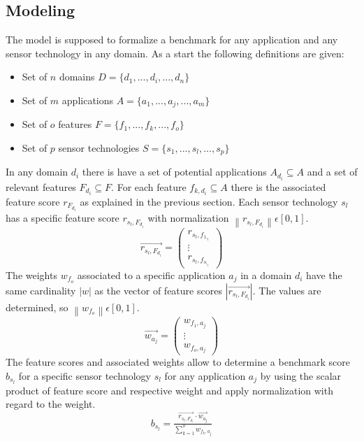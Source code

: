 \subsection{Modeling}
The model is supposed to formalize a benchmark for any application and any sensor technology in any domain. As a start the following definitions are given:
\begin{itemize}
\item Set of $n$ domains \(D=\{d_1,...,d_i,...,d_n\}\)
\item Set of $m$ applications \(A=\{a_1,...,a_j,...,a_m\}\)
\item Set of $o$ features \(F=\{f_1,...,f_k,...,f_o\}\)
\item Set of $p$ sensor technologies \(S=\{s_1,...,s_l,...,s_p\}\)
\end{itemize}
In any domain $d_i$ there is have a set of potential applications \(A_{d_{i}}\subseteq A\) and a set of relevant features \(F_{d_{i}}\subseteq F\). For each feature \(f_{k,d_{i}}\subseteq A\) there is the associated feature score \(r_{F_{d_i}}\) as explained in the previous section. Each sensor technology $s_l$ has a specific feature score \(r_{s_l,F_{d_i}}\) with normalization \(\left \| r_{s_l,F_{d_i}} \right \|\epsilon [0,1]\).
\begin{equation}
\overrightarrow{r_{s_l,F_{d_i}}}= \begin{pmatrix}
r_{s_l,f_{1,_i}}\\ 
\vdots\\
r_{s_l,f_{o,_i}}
\end{pmatrix}
\end{equation} 
The weights $w_{f_o}$ associated to a specific application $a_j$ in a domain $d_i$ have the same cardinality $\left | w \right |$ as the vector of feature scores $\left | \overrightarrow{r_{s_l,F_{d_i}}} \right |$. The values are determined, so \(\left \| w_{f_o} \right \|\epsilon [0,1]\).
\begin{equation}
\overrightarrow{w_{a_j}}=\begin{pmatrix}
w_{f_1,a_j}\\ 
\vdots\\
w_{f_o,a_j}
\end{pmatrix}
\end{equation}
The feature scores and associated weights allow to determine a benchmark score $b_{s_l}$ for a specific sensor technology $s_l$ for any application $a_j$ by using the scalar product of feature score and respective weight and apply normalization with regard to the weight.
\begin{equation}
b_{s_l}=\tfrac{\overrightarrow{r_{s_l,F_{d_i}}}\cdot \overrightarrow{w_{a_j}}}{\sum_{k=1}^{o}w_{f_k,a_j}}
\end{equation}

